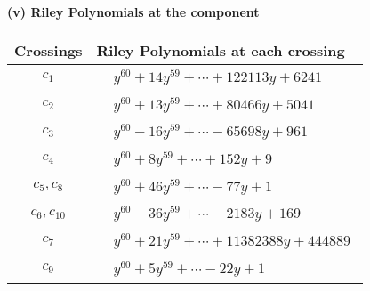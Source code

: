 \documentclass[1p]{elsarticle_modified}
\theoremstyle{definition}
\begin{document}
\newpage\renewcommand{\arraystretch}{1}
\flushleft \textbf{(v) Riley Polynomials at the component}\newline \\
\begin{tabular}{m{50pt}|m{274pt}}
Crossings & \hspace{64pt}Riley Polynomials at each crossing \\
\hline $$\begin{aligned}c_{1}\end{aligned}$$&$\begin{aligned}
&y^{60}+14 y^{59}+\cdots+122113 y+6241
\end{aligned}$\\
\hline $$\begin{aligned}c_{2}\end{aligned}$$&$\begin{aligned}
&y^{60}+13 y^{59}+\cdots+80466 y+5041
\end{aligned}$\\
\hline $$\begin{aligned}c_{3}\end{aligned}$$&$\begin{aligned}
&y^{60}-16 y^{59}+\cdots-65698 y+961
\end{aligned}$\\
\hline $$\begin{aligned}c_{4}\end{aligned}$$&$\begin{aligned}
&y^{60}+8 y^{59}+\cdots+152 y+9
\end{aligned}$\\
\hline $$\begin{aligned}c_{5},c_{8}\end{aligned}$$&$\begin{aligned}
&y^{60}+46 y^{59}+\cdots-77 y+1
\end{aligned}$\\
\hline $$\begin{aligned}c_{6},c_{10}\end{aligned}$$&$\begin{aligned}
&y^{60}-36 y^{59}+\cdots-2183 y+169
\end{aligned}$\\
\hline $$\begin{aligned}c_{7}\end{aligned}$$&$\begin{aligned}
&y^{60}+21 y^{59}+\cdots+11382388 y+444889
\end{aligned}$\\
\hline $$\begin{aligned}c_{9}\end{aligned}$$&$\begin{aligned}
&y^{60}+5 y^{59}+\cdots-22 y+1
\end{aligned}$\\
\hline
\end{tabular}\\~\\
\end{document}
